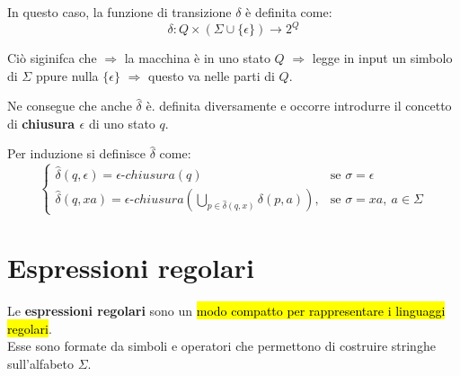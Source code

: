 \documentclass[12pt, a4paper, oneside]{book}
\begin{document}
  In questo caso, la funzione di transizione $\delta$ è definita come:
  \begin{equation*}
    \delta : Q \times (\Sigma \cup \{\epsilon\}) \rightarrow 2^Q
  \end{equation*}

  Ciò siginifca che $\Rightarrow$ la macchina è in uno stato $Q$ $\Rightarrow$ legge in input un simbolo di $\Sigma$ ppure nulla $\{\epsilon\}$ $\Rightarrow$ questo va nelle parti di $Q$.

  Ne consegue che anche $\hat{\delta}$ è. definita diversamente e occorre introdurre il concetto di \textbf{chiusura $\epsilon$} di uno stato $q$.
  

  Per induzione si definisce $\hat{\delta}$ come:
  \begin{equation*}
    \begin{cases}
      \hat{\delta}(q, \epsilon) = \epsilon\text{-}chiusura(q) & \text{se } \sigma = \epsilon \\[0.5em]
      \hat{\delta}(q, xa) = \epsilon\text{-}chiusura\left(\bigcup_{p \in \hat{\delta}(q, x)} \delta(p, a)\right), & \text{se } \sigma = xa, \ a \in \Sigma
    \end{cases}
  \end{equation*}

  \section{Espressioni regolari}
  Le \textbf{espressioni regolari} sono un \hl{modo compatto per rappresentare i linguaggi regolari}. \\[0.2ex]
  Esse sono formate da simboli e operatori che permettono di costruire stringhe sull'alfabeto $\Sigma$.
\end{document}
